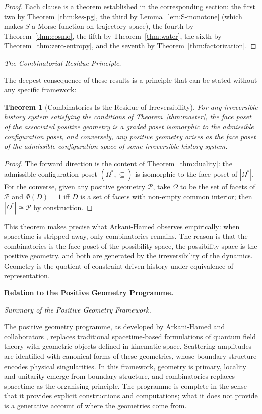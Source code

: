 \documentclass[12pt, oneside]{amsart}
\theoremstyle{plain}
\newtheorem{theorem}{Theorem}[section]
\theoremstyle{definition}
\theoremstyle{remark}
\newcommand{\Phif}{\Phi}
\newcommand{\Sf}{S}
\newcommand{\OmKS}{\Omega}
\begin{document}
\begin{proof}
Each clause is a theorem established in the corresponding section: the first two by Theorem~\ref{thm:kes-pg}, the third by Lemma~\ref{lem:S-monotone} (which makes $\Sf$ a Morse function on trajectory space), the fourth by Theorem~\ref{thm:cosmo}, the fifth by Theorem~\ref{thm:water}, the sixth by Theorem~\ref{thm:zero-entropy}, and the seventh by Theorem~\ref{thm:factorization}.
\end{proof}

\medskip\noindent\textit{The Combinatorial Residue Principle.}

The deepest consequence of these results is a principle that can be stated without any specific framework:

\begin{theorem}[Combinatorics Is the Residue of Irreversibility]
For any irreversible history system satisfying the conditions of Theorem~\ref{thm:master}, the face poset of the associated positive geometry is a graded poset isomorphic to the admissible configuration poset, and conversely, any positive geometry arises as the face poset of the admissible configuration space of some irreversible history system.
\end{theorem}

\begin{proof}
The forward direction is the content of Theorem~\ref{thm:duality}: the admissible configuration poset $(\OmKS^*, \subseteq)$ is isomorphic to the face poset of $|\OmKS^*|$. For the converse, given any positive geometry $\mathcal{P}$, take $\OmKS$ to be the set of facets of $\mathcal{P}$ and $\Phif(D) = 1$ iff $D$ is a set of facets with non-empty common interior; then $|\OmKS^*| \cong \mathcal{P}$ by construction.
\end{proof}

This theorem makes precise what Arkani-Hamed observes empirically: when spacetime is stripped away, only combinatorics remains. The reason is that the combinatorics is the face poset of the possibility space, the possibility space is the positive geometry, and both are generated by the irreversibility of the dynamics. Geometry is the quotient of constraint-driven history under equivalence of representation.

\bigskip\noindent\textbf{Relation to the Positive Geometry Programme.}
\label{sec:relation}

\medskip\noindent\textit{Summary of the Positive Geometry Framework.}

The positive geometry programme, as developed by Arkani-Hamed and collaborators \cite{ArkaniHamed2017, ArkaniHamed2014, ArkaniHamed2012}, replaces traditional spacetime-based formulations of quantum field theory with geometric objects defined in kinematic space. Scattering amplitudes are identified with canonical forms of these geometries, whose boundary structure encodes physical singularities. In this framework, geometry is primary, locality and unitarity emerge from boundary structure, and combinatorics replaces spacetime as the organising principle. The programme is complete in the sense that it provides explicit constructions and computations; what it does not provide is a generative account of where the geometries come from.
\end{document}
